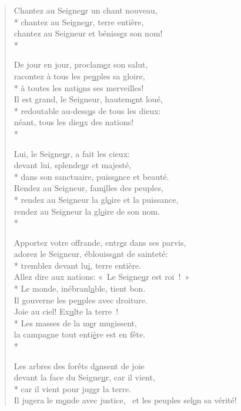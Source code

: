 \begin{verse}
Chantez au Seigne\underline{u}r un chant nouveau, \\*
chantez au Seigne\underline{u}r, terre entière, \\
chantez au Seigneur et béniss\underline{e}z son nom! \\*

De jour en jour, proclam\underline{e}z son salut, \\
racontez à tous les pe\underline{u}ples sa gloire, \\*
à toutes les nati\underline{o}ns ses merveilles! \\

Il est grand, le Seigneur, hautem\underline{e}nt loué, \\*
redoutable au-dess\underline{u}s de tous les dieux: \\
néant, tous les die\underline{u}x des nations! \\*

Lui, le Seigne\underline{u}r, a fait les cieux: \\
devant lui, splende\underline{u}r et majesté, \\*
dans son sanctuaire, puiss\underline{a}nce et beauté. \\

Rendez au Seigneur, fam\underline{i}lles des peuples, \\*
rendez au Seigneur la gl\underline{o}ire et la puissance, \\
rendez au Seigneur la gl\underline{o}ire de son nom. \\*

Apportez votre offrande, entr\underline{e}z dans ses parvis, \\
adorez le Seigneur, éblouiss\underline{a}nt de sainteté: \\*
tremblez devant lu\underline{i}, terre entière. \\

Allez dire aux nations: « Le Seigne\underline{u}r est roi ! » \\*
Le monde, inébranl\underline{a}ble, tient bon. \\
Il gouverne les pe\underline{u}ples avec droiture. \\

Joie au ciel! Ex\underline{u}lte la terre ! \\*
Les masses de la m\underline{e}r mugissent, \\
la campagne tout enti\underline{è}re est en fête. \\*

Les arbres des forêts d\underline{a}nsent de joie \\
devant la face du Seigne\underline{u}r, car il vient, \\*
car il vient pour jug\underline{e}r la terre. \\

Il jugera le m\underline{o}nde avec justice,~\psalmstar
et les peuples sel\underline{o}n sa vérité! \\
\end{verse}


